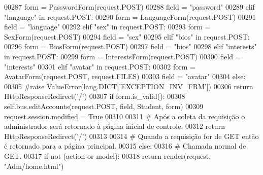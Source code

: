 \begin{DoxyCode}
00287                 form = PasswordForm(request.POST)
00288                 field = \textcolor{stringliteral}{"password"}
00289             \textcolor{keywordflow}{elif} \textcolor{stringliteral}{"language"} \textcolor{keywordflow}{in} request.POST:
00290                 form = LanguageForm(request.POST)
00291                 field = \textcolor{stringliteral}{"language"}
00292             \textcolor{keywordflow}{elif} \textcolor{stringliteral}{"sex"} \textcolor{keywordflow}{in} request.POST:
00293                 form = SexForm(request.POST)
00294                 field = \textcolor{stringliteral}{"sex"}
00295             \textcolor{keywordflow}{elif} \textcolor{stringliteral}{"bios"} \textcolor{keywordflow}{in} request.POST:
00296                 form = BiosForm(request.POST)
00297                 field = \textcolor{stringliteral}{"bios"}
00298             \textcolor{keywordflow}{elif} \textcolor{stringliteral}{"interests"} \textcolor{keywordflow}{in} request.POST:
00299                 form = InterestsForm(request.POST)
00300                 field = \textcolor{stringliteral}{"interests"}
00301             \textcolor{keywordflow}{elif} \textcolor{stringliteral}{"avatar"} \textcolor{keywordflow}{in} request.POST:
00302                 form = AvatarForm(request.POST, request.FILES)
00303                 field = \textcolor{stringliteral}{"avatar"}
00304             \textcolor{keywordflow}{else}:
00305                 \textcolor{comment}{#raise ValueError(lang.DICT['EXCEPTION\_INV\_FRM'])}
00306                 \textcolor{keywordflow}{return} HttpResponseRedirect(\textcolor{stringliteral}{'/'})
00307             \textcolor{keywordflow}{if} form.is\_valid():
00308                 self.bus.editAccounts(request.POST, field, Student, form)
00309                 request.session.modified = \textcolor{keyword}{True}                
00310 
00311             \textcolor{comment}{# Após a coleta da requisição o administrador será retornado à página inicial de controle.}
00312             \textcolor{keywordflow}{return} HttpResponseRedirect(\textcolor{stringliteral}{'/'})
00313 
00314         \textcolor{comment}{# Quando a requisição for de GET então é retornado para a página principal.                        
                         }
00315         \textcolor{keywordflow}{else}:
00316             \textcolor{comment}{# Chamada normal de GET.}
00317             \textcolor{keywordflow}{if} \textcolor{keywordflow}{not} (action \textcolor{keywordflow}{or} model):
00318                 \textcolor{keywordflow}{return} render(request, \textcolor{stringliteral}{"Adm/home.html"})

\end{DoxyCode}
